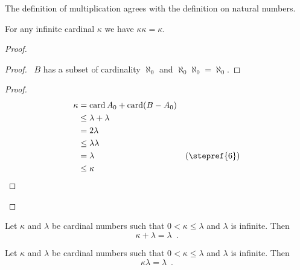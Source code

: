 \begin{theorem}
    The definition of multiplication agrees with the definition on natural numbers.
\end{theorem}

\begin{theorem}[AC]
    For any infinite cardinal $\kappa$ we have $\kappa \kappa = \kappa$.
\end{theorem}

\begin{proof}
    \pf
    \begin{proof}
        \pf\ $B$ has a subset of cardinality $\aleph_0$ and $\aleph_0 \aleph_0 = \aleph_0$.
    \end{proof}
    \begin{proof}
        \pf
        \begin{align*}
            \kappa & = \card A_0 + \card (B - A_0) \\
            & \leq \lambda + \lambda \\
            & = 2 \lambda \\
            & \leq \lambda \lambda \\
            & = \lambda & (\text{\stepref{6}}) \\
            & \leq \kappa & \qed
        \end{align*}
    \end{proof}
\end{proof}

\begin{theorem}
    Let $\kappa$ and $\lambda$ be cardinal numbers such that
    $0 < \kappa \leq \lambda$ and $\lambda$ is infinite. Then
    \[ \kappa + \lambda = \lambda \enspace . \]
\end{theorem}

\begin{theorem}
    Let $\kappa$ and $\lambda$ be cardinal numbers such that
    $0 < \kappa \leq \lambda$ and $\lambda$ is infinite. Then
    \[ \kappa \lambda = \lambda \enspace . \]
\end{theorem}


